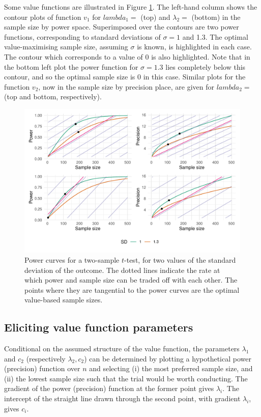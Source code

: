 \documentclass[sagev, Crown]{sagej}
\begin{document}
Some value functions are illustrated in Figure \ref{fig:p1}. The left-hand column shows the contour plots of function $v_1$ for $lambda_1 = $ (top) and $\lambda_2 = $ (bottom) in the sample size by power space. Superimposed over the contours are two power functions, corresponding to standard deviations of $\sigma = 1$ and 1.3. The optimal value-maximising sample size, assuming $\sigma$ is known, is highlighted in each case. The contour which corresponds to a value of 0 is also highlighted. Note that in the bottom left plot the power function for $\sigma = 1.3$ lies completely below this contour, and so the optimal sample size is 0 in this case. Similar plots for the function $v_2$, now in the sample size by precision place, are given for $lambda_2 = $ (top and bottom, respectively).

\begin{figure}
\centering
\includegraphics[scale=0.7]{./figures/p1}
\caption{Power curves for a two-sample $t$-test, for two values of the standard deviation of the outcome. The dotted lines indicate the rate at which power and sample size can be traded off with each other. The points where they are tangential to the power curves are the optimal value-based sample sizes.}
\label{fig:p1}
\end{figure}

\subsection{Eliciting value function parameters}

Conditional on the assumed structure of the value function, the parameters $\lambda_1$ and $c_2$ (respectively $\lambda_2, c_2$) can be determined by plotting a hypothetical power (precision) function over $n$ and selecting (i) the most preferred sample size, and (ii) the lowest sample size such that the trial would be worth conducting. The gradient of the power (precision) function at the former point gives $\lambda_i$. The intercept of the straight line drawn through the second point, with gradient $\lambda_i$, gives $c_i$.
\end{document}
